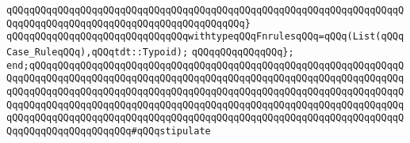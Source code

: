 \verb|qQQqqQQqqQQqqQQqqQQqqQQqqQQqqQQqqQQqqQQqqQQqqQQqqQQqqQQqqQQqqQQqqQQqqQQqqQQqqQQqqQQqqQQqqQQqqQQqqQQqqQQqqQQqqQQq}|\newline
\newline
\verb|qQQqqQQqqQQqqQQqqQQqqQQqqQQqqQQqwithtypeqQQqFnrulesqQQq=qQQq(List(qQQqCase_RuleqQQq),qQQqtdt::Typoid);|\newline
\newline
\verb|qQQqqQQqqQQqqQQq};|\newline
\verb|end;qQQqqQQqqQQqqQQqqQQqqQQqqQQqqQQqqQQqqQQqqQQqqQQqqQQqqQQqqQQqqQQqqQQqqQQqqQQqqQQqqQQqqQQqqQQqqQQqqQQqqQQqqQQqqQQqqQQqqQQqqQQqqQQqqQQqqQQqqQQqqQQqqQQqqQQqqQQqqQQqqQQqqQQqqQQqqQQqqQQqqQQqqQQqqQQqqQQqqQQqqQQqqQQqqQQqqQQqqQQqqQQqqQQqqQQqqQQqqQQqqQQqqQQqqQQqqQQqqQQqqQQqqQQqqQQqqQQqqQQqqQQqqQQqqQQqqQQqqQQqqQQqqQQqqQQqqQQqqQQqqQQqqQQqqQQqqQQqqQQqqQQqqQQqqQQqqQQqqQQqqQQqqQQq#qQQqstipulate|\newline
\newline

